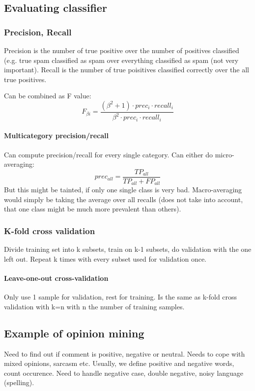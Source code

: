\documentclass[11pt]{article}
\begin{document}
\subsection{Evaluating classifier}
\subsubsection{Precision, Recall}
Precision is the number of true positive over the number of positives classified
(e.g. true spam classified as spam over everything classified as spam (not very important).
Recall is the number of true poisitives classified correctly over the all true positives.

Can be combined as F value:
\begin{equation}
	F_{\beta i} = \frac{(\beta^2 + 1)\cdot prec_i \cdot recall_i}{\beta^2 \cdot prec_i \cdot recall_i}
\end{equation}
\paragraph{Multicategory precision/recall}
Can compute precision/recall for every single category. Can either do micro-averaging:
\begin{equation}
	prec_{all} = \frac{TP_{all}}{TP_{all} + FP_{all}}
\end{equation}
But this might be tainted, if only one single class is very bad. Macro-averaging would simply be taking the average over all recalls (does not take into
account, that one class might be much more prevalent than others). 

\subsubsection{K-fold cross validation}
Divide training set into k subsets, train on k-1 subsets, do validation with the one left out. Repeat k times with every subset used for validation once.
\paragraph{Leave-one-out cross-validation}
Only use 1 sample for validation, rest for training. Is the same as k-fold cross validation
with k=n with n the number of training samples.

\subsection{Example of opinion mining}
Need to find out if comment is positive, negative or neutral. Needs to cope with mixed
opinions, sarcasm etc. Usually, we define positive and negative words, count occurence. 
Need to handle negative case, double negative, noisy language (spelling).
\end{document}

